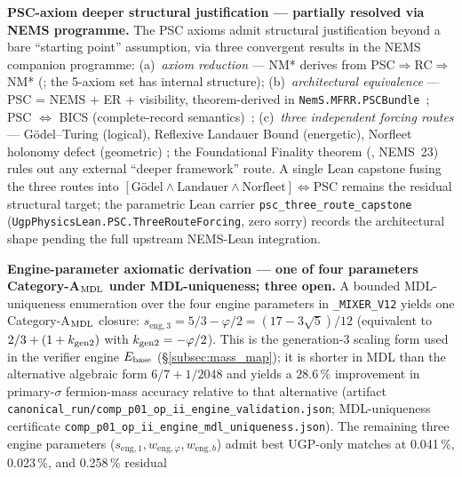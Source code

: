 \documentclass[11pt]{article}
\theoremstyle{remark}
\begin{document}
{\RaggedRight\sloppy
\begin{description}[leftmargin=2em,labelindent=0.5em,itemsep=0.28em]
  \item[(i)] \textbf{PSC-axiom deeper structural justification --- partially resolved via NEMS programme.}
  The PSC axioms admit structural justification beyond a bare ``starting point'' assumption,
  via three convergent results in the NEMS companion programme:
  (a)~\textit{axiom reduction} --- NM* derives from PSC$\Rightarrow$RC$\Rightarrow$NM*
  (\cite{SpivackNMstar}; the 5-axiom set has internal structure);
  (b)~\textit{architectural equivalence} --- PSC = NEMS + ER + visibility, theorem-derived
  in \texttt{NemS.MFRR.PSCBundle}~\cite{SpivackNEMSMFRRBridge}; PSC $\Leftrightarrow$ BICS
  (complete-record semantics)~\cite{SpivackNEMSHub};
  (c)~\textit{three independent forcing routes} --- G\"odel--Turing (logical),
  Reflexive Landauer Bound (energetic), Norfleet holonomy defect (geometric)
  \cite{SpivackMFRR,SpivackNEMS88}; the Foundational Finality theorem
  (\cite{SpivackNEMS05}, NEMS~23) rules out any external ``deeper framework'' route.
  A single Lean capstone fusing the three routes into
  $[\text{G\"odel} \wedge \text{Landauer} \wedge \text{Norfleet}] \Leftrightarrow \text{PSC}$
  remains the residual structural target; the parametric Lean carrier
  \texttt{psc\_three\_route\_capstone} (\texttt{UgpPhysicsLean.PSC.ThreeRouteForcing}, zero sorry)
  records the architectural shape pending the full upstream NEMS-Lean integration.
  \item[(ii)] \textbf{Engine-parameter axiomatic derivation --- one of four parameters
  Category-A$_{\rm MDL}$ under MDL-uniqueness; three open.}
  A bounded MDL-uniqueness enumeration over the four engine parameters in \texttt{\_MIXER\_V12}
  yields one Category-A$_{\rm MDL}$ closure: $s_{\text{eng},3} = 5/3 - \varphi/2 = (17 - 3\sqrt5)/12$
  (equivalent to $2/3 + (1 + k_{\rm gen2})$ with $k_{\rm gen2} = -\varphi/2$).  This is the
  generation-3 scaling form used in the verifier engine $E_{\rm base}$
  (\S\ref{subsec:mass_map}); it is shorter in MDL than the alternative algebraic form
  $6/7 + 1/2048$ and yields a $28.6\,\%$ improvement in primary-$\sigma$ fermion-mass accuracy
  relative to that alternative (artifact \texttt{canonical\_run/comp\_p01\_op\_ii\_engine\_validation.json};
  MDL-uniqueness certificate \texttt{comp\_p01\_op\_ii\_engine\_mdl\_uniqueness.json}).
  The remaining three engine parameters ($s_{\text{eng},1}, w_{\text{eng},\varphi}, w_{\text{eng},b}$)
  admit best UGP-only matches at 0.041\,\%, 0.023\,\%, and 0.258\,\% residual

\end{description}}
\end{document}
